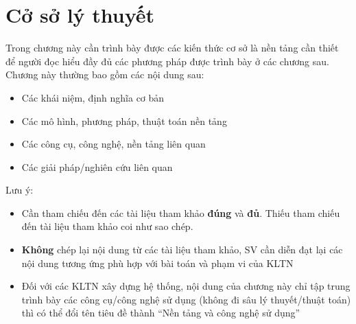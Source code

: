 \chapter{Cở sở lý thuyết}

Trong chương này cần trình bày được các kiến thức cơ sở là nền tảng cần thiết để người đọc hiểu đầy đủ các phương pháp được trình bày ở các chương sau. Chương này thường bao gồm các nội dung sau:
\begin{itemize}
    \item Các khái niệm, định nghĩa cơ bản
    \item Các mô hình, phương pháp, thuật toán nền tảng
    \item Các công cụ, công nghệ, nền tảng liên quan
    \item Các giải pháp/nghiên cứu liên quan

\end{itemize}

Lưu ý:

\begin{itemize}
    \item Cần tham chiếu đến các tài liệu tham khảo \textbf{đúng} và \textbf{đủ}. Thiếu tham chiếu đến tài liệu tham khảo coi như sao chép.
    \item \textbf{Không} chép lại nội dung từ các tài liệu tham khảo, SV cần diễn đạt lại các nội dung tương ứng phù hợp với bài toán và phạm vi của KLTN
    \item Đối với các KLTN xây dựng hệ thống, nội dung của chương này chỉ tập trung trình bày các công cụ/công nghệ sử dụng (không đi sâu lý thuyết/thuật toán) thì có thể đổi tên tiêu đề thành ``Nền tảng và công nghệ sử dụng''
\end{itemize}
